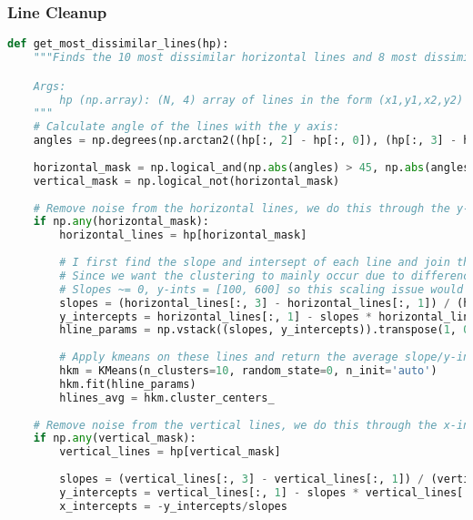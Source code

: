 \documentclass{article}
\begin{document}
\subsubsection{Line Cleanup}
\begin{lstlisting}[language=Python]
    def get_most_dissimilar_lines(hp):
    """Finds the 10 most dissimilar horizontal lines and 8 most dissimilar vertical lines to remove noise in the output of the hough transform.

    Args:
        hp (np.array): (N, 4) array of lines in the form (x1,y1,x2,y2)
    """
    # Calculate angle of the lines with the y axis:
    angles = np.degrees(np.arctan2((hp[:, 2] - hp[:, 0]), (hp[:, 3] - hp[:, 1])))
        
    horizontal_mask = np.logical_and(np.abs(angles) > 45, np.abs(angles) < 135)
    vertical_mask = np.logical_not(horizontal_mask)
    
    # Remove noise from the horizontal lines, we do this through the y-intercept
    if np.any(horizontal_mask):
        horizontal_lines = hp[horizontal_mask]
        
        # I first find the slope and intersept of each line and join them into one array
        # Since we want the clustering to mainly occur due to differences in the y-int, it is fine to not normalize these value
        # Slopes ~= 0, y-ints = [100, 600] so this scaling issue would be important for normal clustering
        slopes = (horizontal_lines[:, 3] - horizontal_lines[:, 1]) / (horizontal_lines[:, 2] - horizontal_lines[:, 0] + 1e-10)  # avoid division by zero
        y_intercepts = horizontal_lines[:, 1] - slopes * horizontal_lines[:, 0]
        hline_params = np.vstack((slopes, y_intercepts)).transpose(1, 0)
        
        # Apply kmeans on these lines and return the average slope/y-intercept for each cluster. This joins noisy line pairs together
        hkm = KMeans(n_clusters=10, random_state=0, n_init='auto')
        hkm.fit(hline_params)
        hlines_avg = hkm.cluster_centers_
        
    # Remove noise from the vertical lines, we do this through the x-intercept:
    if np.any(vertical_mask):
        vertical_lines = hp[vertical_mask]
        
        slopes = (vertical_lines[:, 3] - vertical_lines[:, 1]) / (vertical_lines[:, 2] - vertical_lines[:, 0] + 1e-10)  # avoid division by zero
        y_intercepts = vertical_lines[:, 1] - slopes * vertical_lines[:, 0]
        x_intercepts = -y_intercepts/slopes


\end{lstlisting}
\end{document}
